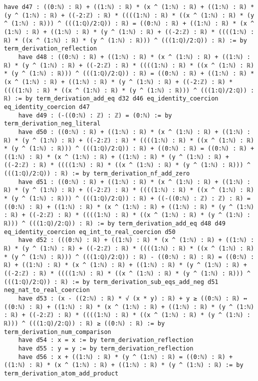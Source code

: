 \documentclass{article}
\begin{document}
\begin{tcolorbox}[colback=white!10, width=\linewidth]
\begin{lstlisting}[language=Lean4]
    have d47 : ((0:ℕ) : ℝ) + ((1:ℕ) : ℝ) * (x ^ (1:ℕ) : ℝ) + ((1:ℕ) : ℝ) * (y ^ (1:ℕ) : ℝ) + ((-2:ℤ) : ℝ) * ((((1:ℕ) : ℝ) * ((x ^ (1:ℕ) : ℝ) * (y ^ (1:ℕ) : ℝ))) ^ (((1:ℚ)/2:ℚ)) : ℝ) = ((0:ℕ) : ℝ) + ((1:ℕ) : ℝ) * (x ^ (1:ℕ) : ℝ) + ((1:ℕ) : ℝ) * (y ^ (1:ℕ) : ℝ) + ((-2:ℤ) : ℝ) * ((((1:ℕ) : ℝ) * ((x ^ (1:ℕ) : ℝ) * (y ^ (1:ℕ) : ℝ))) ^ (((1:ℚ)/2:ℚ)) : ℝ) := by term_derivation_reflection
    have d48 : ((0:ℕ) : ℝ) + ((1:ℕ) : ℝ) * (x ^ (1:ℕ) : ℝ) + ((1:ℕ) : ℝ) * (y ^ (1:ℕ) : ℝ) + ((-2:ℤ) : ℝ) * ((((1:ℕ) : ℝ) * ((x ^ (1:ℕ) : ℝ) * (y ^ (1:ℕ) : ℝ))) ^ (((1:ℚ)/2:ℚ)) : ℝ) = ((0:ℕ) : ℝ) + ((1:ℕ) : ℝ) * (x ^ (1:ℕ) : ℝ) + ((1:ℕ) : ℝ) * (y ^ (1:ℕ) : ℝ) + ((-2:ℤ) : ℝ) * ((((1:ℕ) : ℝ) * ((x ^ (1:ℕ) : ℝ) * (y ^ (1:ℕ) : ℝ))) ^ (((1:ℚ)/2:ℚ)) : ℝ) := by term_derivation_add_eq d32 d46 eq_identity_coercion eq_identity_coercion d47
    have d49 : (-((0:ℕ) : ℤ) : ℤ) = (0:ℕ) := by term_derivation_neg_literal
    have d50 : ((0:ℕ) : ℝ) + ((1:ℕ) : ℝ) * (x ^ (1:ℕ) : ℝ) + ((1:ℕ) : ℝ) * (y ^ (1:ℕ) : ℝ) + ((-2:ℤ) : ℝ) * ((((1:ℕ) : ℝ) * ((x ^ (1:ℕ) : ℝ) * (y ^ (1:ℕ) : ℝ))) ^ (((1:ℚ)/2:ℚ)) : ℝ) + ((0:ℕ) : ℝ) = ((0:ℕ) : ℝ) + ((1:ℕ) : ℝ) * (x ^ (1:ℕ) : ℝ) + ((1:ℕ) : ℝ) * (y ^ (1:ℕ) : ℝ) + ((-2:ℤ) : ℝ) * ((((1:ℕ) : ℝ) * ((x ^ (1:ℕ) : ℝ) * (y ^ (1:ℕ) : ℝ))) ^ (((1:ℚ)/2:ℚ)) : ℝ) := by term_derivation_nf_add_zero
    have d51 : ((0:ℕ) : ℝ) + ((1:ℕ) : ℝ) * (x ^ (1:ℕ) : ℝ) + ((1:ℕ) : ℝ) * (y ^ (1:ℕ) : ℝ) + ((-2:ℤ) : ℝ) * ((((1:ℕ) : ℝ) * ((x ^ (1:ℕ) : ℝ) * (y ^ (1:ℕ) : ℝ))) ^ (((1:ℚ)/2:ℚ)) : ℝ) + ((-((0:ℕ) : ℤ) : ℤ) : ℝ) = ((0:ℕ) : ℝ) + ((1:ℕ) : ℝ) * (x ^ (1:ℕ) : ℝ) + ((1:ℕ) : ℝ) * (y ^ (1:ℕ) : ℝ) + ((-2:ℤ) : ℝ) * ((((1:ℕ) : ℝ) * ((x ^ (1:ℕ) : ℝ) * (y ^ (1:ℕ) : ℝ))) ^ (((1:ℚ)/2:ℚ)) : ℝ) := by term_derivation_add_eq d48 d49 eq_identity_coercion eq_int_to_real_coercion d50
    have d52 : (((0:ℕ) : ℝ) + ((1:ℕ) : ℝ) * (x ^ (1:ℕ) : ℝ) + ((1:ℕ) : ℝ) * (y ^ (1:ℕ) : ℝ) + ((-2:ℤ) : ℝ) * ((((1:ℕ) : ℝ) * ((x ^ (1:ℕ) : ℝ) * (y ^ (1:ℕ) : ℝ))) ^ (((1:ℚ)/2:ℚ)) : ℝ) - ((0:ℕ) : ℝ) : ℝ) = ((0:ℕ) : ℝ) + ((1:ℕ) : ℝ) * (x ^ (1:ℕ) : ℝ) + ((1:ℕ) : ℝ) * (y ^ (1:ℕ) : ℝ) + ((-2:ℤ) : ℝ) * ((((1:ℕ) : ℝ) * ((x ^ (1:ℕ) : ℝ) * (y ^ (1:ℕ) : ℝ))) ^ (((1:ℚ)/2:ℚ)) : ℝ) := by term_derivation_sub_eqs_add_neg d51 neg_nat_to_real_coercion
    have d53 : (x - ((2:ℕ) : ℝ) * √ (x * y) : ℝ) + y ≥ ((0:ℕ) : ℝ) ↔ ((0:ℕ) : ℝ) + ((1:ℕ) : ℝ) * (x ^ (1:ℕ) : ℝ) + ((1:ℕ) : ℝ) * (y ^ (1:ℕ) : ℝ) + ((-2:ℤ) : ℝ) * ((((1:ℕ) : ℝ) * ((x ^ (1:ℕ) : ℝ) * (y ^ (1:ℕ) : ℝ))) ^ (((1:ℚ)/2:ℚ)) : ℝ) ≥ ((0:ℕ) : ℝ) := by term_derivation_num_comparison
    have d54 : x = x := by term_derivation_reflection
    have d55 : y = y := by term_derivation_reflection
    have d56 : x + ((1:ℕ) : ℝ) * (y ^ (1:ℕ) : ℝ) = ((0:ℕ) : ℝ) + ((1:ℕ) : ℝ) * (x ^ (1:ℕ) : ℝ) + ((1:ℕ) : ℝ) * (y ^ (1:ℕ) : ℝ) := by term_derivation_atom_add_product

\end{lstlisting}
\end{tcolorbox}
\end{document}
